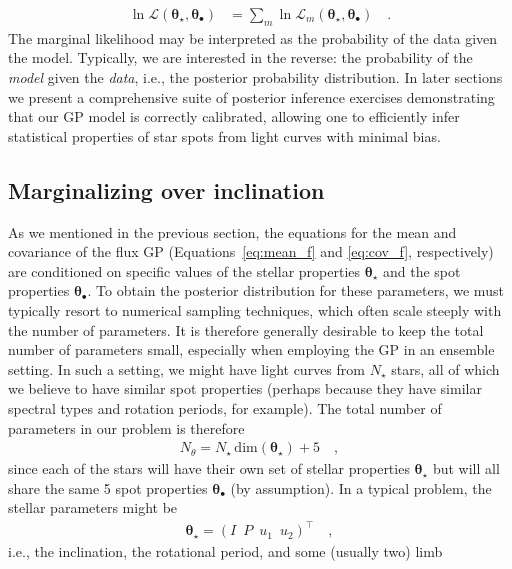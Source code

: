 \documentclass[modern]{aastex62}
\begin{document}
%
\begin{align}
    \ln \mathcal{L}\left(\pmb{\theta}_\star, \pmb{\theta}_\bullet\right)
     & =
    \sum_{m} \ln \mathcal{L}_m\left(\pmb{\theta}_\star, \pmb{\theta}_\bullet\right)
    \quad.
\end{align}
%
The marginal likelihood may be interpreted as the probability of the data
given the model. Typically, we are interested in the reverse: the probability
of the \emph{model} given the \emph{data}, i.e., the posterior probability
distribution. In later sections we present a comprehensive suite of
posterior inference exercises demonstrating that our GP model is correctly
calibrated, allowing one to efficiently infer statistical properties of star spots
from light curves with minimal bias.


\subsection{Marginalizing over inclination}
\label{sec:inclination}
%
As we mentioned in the previous section,
the equations for the mean and covariance of the flux GP
(Equations~\ref{eq:mean_f} and \ref{eq:cov_f}, respectively) are conditioned
on specific values of the stellar properties $\pmb{\theta}_\star$ and the
spot properties $\pmb{\theta}_\bullet$. To obtain the posterior distribution
for these parameters, we must typically resort to numerical sampling techniques,
which often scale steeply with the number of parameters. It is therefore generally
desirable to keep the total number of parameters small, especially when
employing the GP in an ensemble setting.
In such a setting, we might have light curves from $N_\star$ stars, all of which
we believe to have similar spot properties (perhaps because they have
similar spectral types and rotation periods, for example).
The total number of parameters in our problem is therefore
%
\begin{align}
    N_\theta = N_\star \, \mathrm{dim}(\pmb{\theta}_\star) + 5
    \quad,
\end{align}
%
since each of the stars will have their own set of stellar properties
$\pmb{\theta}_\star$ but will all share the same 5 spot properties
$\pmb{\theta}_\bullet$ (by assumption).
In a typical problem, the stellar parameters might be
%
\begin{align}
    \pmb{\theta}_\star =
    \left(
    I \,\,\,
    P \,\,\,
    u_1 \,\,\,
    u_2
    \right)^\top
    \quad,
\end{align}
%
i.e., the inclination, the rotational period, and some (usually two) limb
\end{document}
